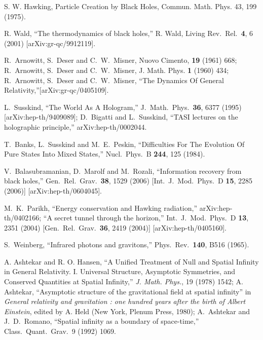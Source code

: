 \documentclass[12pt,onecolumn,eqsecnum,aps,prd,nofootinbib]{revtex4}
\begin{document}
\begin{thebibliography}{99}

 S. W. Hawking,
Particle Creation by Black Holes, Commun. Math. Phys. 43, 199
(1975).


 R. Wald, ``The thermodynamics of black holes,'' R. Wald, Living Rev.\
Rel.\  {\bf 4}, 6 (2001) [arXiv:gr-qc/9912119].

 R.~Arnowitt, S.~Deser and C.~W.~Misner, Nuovo Cimento,
\textbf{19} (1961) 668; R.~Arnowitt, S.~Deser and C.~W.~Misner, J.
Math. Phys. \textbf{1} (1960) 434; R.~Arnowitt, S.~Deser and
C.~W.~Misner, ``The Dynamics Of General
Relativity,''[arXiv:gr-qc/0405109].

L.~Susskind,
  ``The World As A Hologram,''
  J.\ Math.\ Phys.\  {\bf 36}, 6377 (1995)
  [arXiv:hep-th/9409089];
  D.~Bigatti and L.~Susskind,
  ``TASI lectures on the holographic principle,''
  arXiv:hep-th/0002044.


T.~Banks, L.~Susskind and M.~E.~Peskin,
  ``Difficulties For The Evolution Of Pure States Into Mixed States,''
  Nucl.\ Phys.\  B {\bf 244}, 125 (1984).


  V.~Balasubramanian, D.~Marolf and M.~Rozali,
  ``Information recovery from black holes,''
  Gen.\ Rel.\ Grav.\  {\bf 38}, 1529 (2006)
  [Int.\ J.\ Mod.\ Phys.\  D {\bf 15}, 2285 (2006)]
  [arXiv:hep-th/0604045].

 M.~K.~Parikh,
  ``Energy conservation and Hawking radiation,''
  arXiv:hep-th/0402166;
  ``A secret tunnel through the horizon,''
  Int.\ J.\ Mod.\ Phys.\  D {\bf 13}, 2351 (2004)
  [Gen.\ Rel.\ Grav.\  {\bf 36}, 2419 (2004)]
  [arXiv:hep-th/0405160].

  S.~Weinberg,
  ``Infrared photons and gravitons,''
  Phys.\ Rev.\  {\bf 140}, B516 (1965).

 A. Ashtekar and R. O. Hansen, ``A Unified Treatment
of Null and Spatial Infinity in General Relativity. I. Universal
Structure, Asymptotic Symmetries, and Conserved Quantities at
Spatial Infinity,'' \textit{J. Math. Phys.}, 19 (1978) 1542; A.
Ashtekar, ``Asymptotic structure of the gravitational field at
spatial infinity'' in  \textit{General relativity and gravitation :
one hundred years after the birth of Albert Einstein}, edited by A.
Held (New York, Plenum Press, 1980); A.~Ashtekar and J.~D.~Romano,
``Spatial infinity as a boundary of space-time,'' Class.\ Quant.\
Grav.\ 9 (1992) 1069.



\end{thebibliography}
\end{document}
